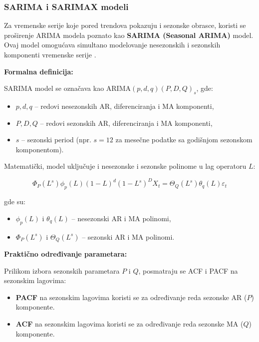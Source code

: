 \documentclass[12pt]{article}
\begin{document}
\subsubsection{SARIMA i SARIMAX modeli}

Za vremenske serije koje pored trendova pokazuju i sezonske obrasce, koristi se proširenje ARIMA modela poznato kao \textbf{SARIMA (Seasonal ARIMA)} model. Ovaj model omogućava simultano modelovanje nesezonskih i sezonskih komponenti vremenske serije \cite{box1970, brockwell2002}.

\textbf{Formalna definicija:}

SARIMA model se označava kao ARIMA$(p,d,q)(P,D,Q)_s$, gde:

\begin{itemize}
    \item $p,d,q$ -- redovi nesezonskih AR, diferenciranja i MA komponenti,
    \item $P,D,Q$ -- redovi sezonskih AR, diferenciranja i MA komponenti,
    \item $s$ -- sezonski period (npr. $s=12$ za mesečne podatke sa godišnjom sezonskom komponentom).
\end{itemize}

Matematički, model uključuje i nesezonske i sezonske polinome u lag operatoru $L$:

\begin{equation}
\Phi_P (L^s) \phi_p (L) (1 - L)^d (1 - L^s)^D X_t
= \Theta_Q (L^s) \theta_q (L) \varepsilon_t
\end{equation}

gde su:
\begin{itemize}
    \item $\phi_p(L)$ i $\theta_q(L)$ -- nesezonski AR i MA polinomi,
    \item $\Phi_P(L^s)$ i $\Theta_Q(L^s)$ -- sezonski AR i MA polinomi.
\end{itemize}

\textbf{Praktično određivanje parametara:}

Prilikom izbora sezonskih parametara $P$ i $Q$, posmatraju se ACF i PACF na sezonskim lagovima:

\begin{itemize}
    \item \textbf{PACF} na sezonskim lagovima koristi se za određivanje reda sezonske AR ($P$) komponente.
    \item \textbf{ACF} na sezonskim lagovima koristi se za određivanje reda sezonske MA ($Q$) komponente.
\end{itemize}
\end{document}
